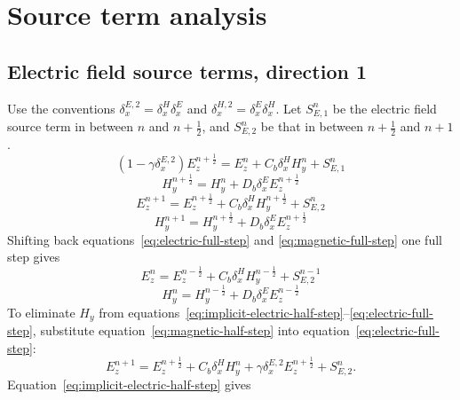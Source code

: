 \documentclass{article}
\numberwithin{figure}{section}
\begin{document}
\section{Source term analysis}
\subsection{Electric field source terms, direction 1}

Use the conventions $\delta_x^{E,2}=\delta_x^H\delta_x^E$ and $\delta_x^{H,2}=\delta_x^E\delta_x^H$.
Let $S_{E,1}^n$ be the electric field source term in between $n$ and $n+\frac{1}{2}$, and $S_{E,2}^n$ be that in between $n+\frac{1}{2}$ and $n+1$.
\begin{equation}
    \left(1-\gamma\delta_x^{E,2}\right)E_z^{n+\frac{1}{2}} = E_z^n+C_b\delta_x^H H_y^n+S_{E,1}^n \label{eq:implicit-electric-half-step}
\end{equation}
\begin{equation}
    H_y^{n+\frac{1}{2}} = H_y^n+D_b\delta_x^E E_z^{n+\frac{1}{2}} \label{eq:magnetic-half-step}
\end{equation}
\begin{equation}
    E_z^{n+1} = E_z^{n+\frac{1}{2}} + C_b\delta_x^H H_y^{n+\frac{1}{2}}+S_{E,2}^n \label{eq:electric-full-step}
\end{equation}
\begin{equation}
    H_y^{n+1} = H_y^{n+\frac{1}{2}} + D_b\delta_x^E E_z^{n+\frac{1}{2}} \label{eq:magnetic-full-step}
\end{equation}
Shifting back equations~\eqref{eq:electric-full-step} and \eqref{eq:magnetic-full-step} one full step gives
\begin{equation}
    E_z^n = E_z^{n-\frac{1}{2}} + C_b\delta_x^H H_y^{n-\frac{1}{2}}+S_{E,2}^{n-1} \label{eq:shifted-electric-step}
\end{equation}
\begin{equation}
    H_y^n = H_y^{n-\frac{1}{2}} + D_b\delta_x^E E_z^{n-\frac{1}{2}} \label{eq:shifted-magnetic-step}
\end{equation}
To eliminate $H_y$ from equations~\eqref{eq:implicit-electric-half-step}--\eqref{eq:electric-full-step}, substitute equation~\eqref{eq:magnetic-half-step} into equation~\eqref{eq:electric-full-step}:
\begin{equation}
    E_z^{n+1} = E_z^{n+\frac{1}{2}} + C_b\delta_x^H H_y^n + \gamma\delta_x^{E,2} E_z^{n+\frac{1}{2}}+S_{E,2}^n. \label{eq:e-after-h-substitution}
\end{equation}
Equation~\eqref{eq:implicit-electric-half-step} gives
\end{document}

